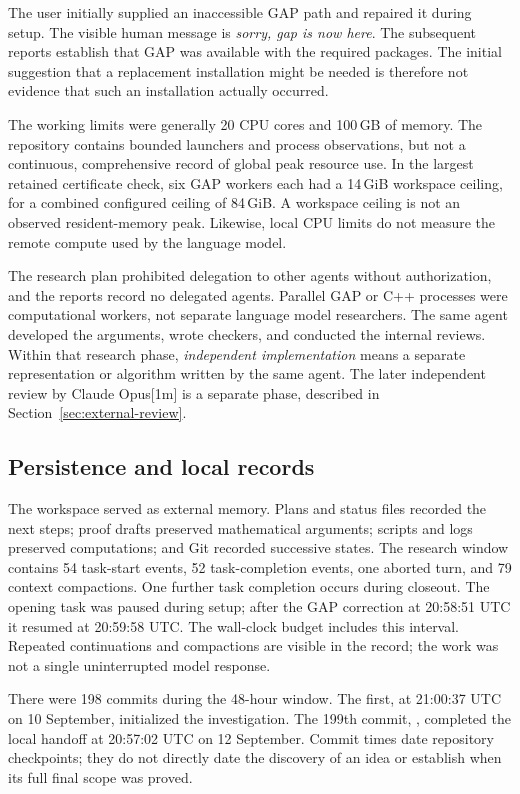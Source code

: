 The user initially supplied an inaccessible GAP path and repaired it
during setup. The visible human message is \emph{sorry, gap is now here}.
The subsequent reports establish that GAP was available with the
required packages. The initial suggestion that a replacement
installation might be needed is therefore not evidence that such an
installation actually occurred.

The working limits were generally 20 CPU cores and 100\,GB of memory.
The repository contains bounded launchers and process observations,
but not a continuous, comprehensive record of global peak resource
use. In the largest retained certificate check, six GAP workers each
had a 14\,GiB workspace ceiling, for a combined configured ceiling of
84\,GiB. A workspace ceiling is not an observed resident-memory peak.
Likewise, local CPU limits do not measure the remote compute used by
the language model.

The research plan prohibited delegation to other agents without
authorization, and the reports record no delegated agents. Parallel
GAP or C++ processes were computational workers, not separate language
model researchers. The same agent developed the arguments, wrote
checkers, and conducted the internal reviews. Within that research phase, \emph{independent implementation} means a
separate representation or algorithm written by the same agent. The later
independent review by Claude Opus[1m] is a separate phase, described in
Section~\ref{sec:external-review}.

\subsection{Persistence and local records}

The workspace served as external memory. Plans and status files recorded
the next steps; proof drafts preserved mathematical arguments; scripts
and logs preserved computations; and Git recorded successive states.
The research window contains 54 task-start events, 52 task-completion
events, one aborted turn, and 79 context compactions. One further task
completion occurs during closeout. The opening task was paused during
setup; after the GAP correction at 20:58:51 UTC it resumed at
20:59:58 UTC. The wall-clock budget includes this interval. Repeated
continuations and compactions are visible in the record; the work was
not a single uninterrupted model response.

There were 198 commits during the 48-hour window. The first, at
21:00:37 UTC on 10 September, initialized the investigation.
The 199th commit, \snapshot{}, completed the local handoff at
20:57:02 UTC on 12 September. Commit times date repository checkpoints;
they do not directly date the discovery of an idea or establish when
its full final scope was proved.

